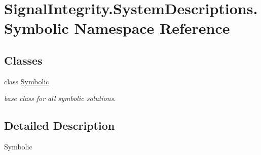 \hypertarget{namespaceSignalIntegrity_1_1SystemDescriptions_1_1Symbolic}{}\section{Signal\+Integrity.\+System\+Descriptions.\+Symbolic Namespace Reference}
\label{namespaceSignalIntegrity_1_1SystemDescriptions_1_1Symbolic}
\subsection*{Classes}
\begin{DoxyCompactItemize}
\item 
class \hyperlink{classSignalIntegrity_1_1SystemDescriptions_1_1Symbolic_1_1Symbolic}{Symbolic}
\begin{DoxyCompactList}\small\item\em base class for all symbolic solutions. \end{DoxyCompactList}\end{DoxyCompactItemize}


\subsection{Detailed Description}
\begin{DoxyVerb}Symbolic\end{DoxyVerb}
 